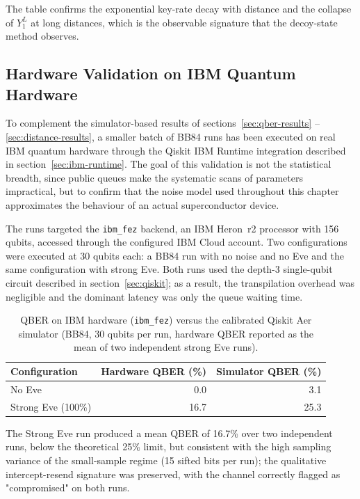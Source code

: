 \documentclass[12pt, a4paper]{article}
\begin{document}
The table confirms the exponential key-rate decay with distance and the
collapse of $Y_1^L$ at long distances, which is the observable signature
that the decoy-state method observes.

\subsection{Hardware Validation on IBM Quantum Hardware}
\label{sec:hardware-validation}

To complement the simulator-based results of sections~\ref{sec:qber-results}%
--\ref{sec:distance-results}, a smaller batch of BB84 runs has been executed on real IBM quantum hardware through the Qiskit IBM Runtime integration described in section~\ref{sec:ibm-runtime}. The goal of this validation is
not the statistical breadth, since public queues make the systematic scans of parameters impractical, but to confirm that the noise model used throughout this chapter approximates the behaviour of an actual superconductor device.

The runs targeted the \texttt{ibm\_fez} backend, an IBM Heron~r2 processor with 156 qubits, accessed through the configured IBM Cloud account. Two configurations were executed at 30 qubits each: a BB84 run with no noise and no Eve and the same configuration with strong Eve. Both runs used the depth-3 single-qubit circuit described in section~\ref{sec:qiskit}; as a result, the transpilation overhead was negligible and the dominant latency was only the queue waiting time.

\begin{table}[H]
  \centering
  \caption{QBER on IBM hardware (\texttt{ibm\_fez}) versus the calibrated
           Qiskit Aer simulator (BB84, 30 qubits per run, hardware QBER reported
           as the mean of two independent strong Eve runs).}
  \label{tab:hardware-vs-sim}
  \begin{tabular}{@{} l r r @{}}
    \toprule
    \textbf{Configuration} & \textbf{Hardware QBER (\%)} & \textbf{Simulator QBER (\%)} \\
    \midrule
    No Eve             &  0.0 &  3.1 \\
    Strong Eve (100\%) & 16.7 & 25.3 \\
    \bottomrule
  \end{tabular}
\end{table}


The Strong Eve run produced a mean QBER of 16.7\% over two independent runs, below the theoretical 25\% limit, but consistent with the high sampling variance of the small-sample regime (15 sifted bits per run); the qualitative intercept-resend signature was preserved, with the channel correctly flagged as "compromised" on both runs.
\end{document}
